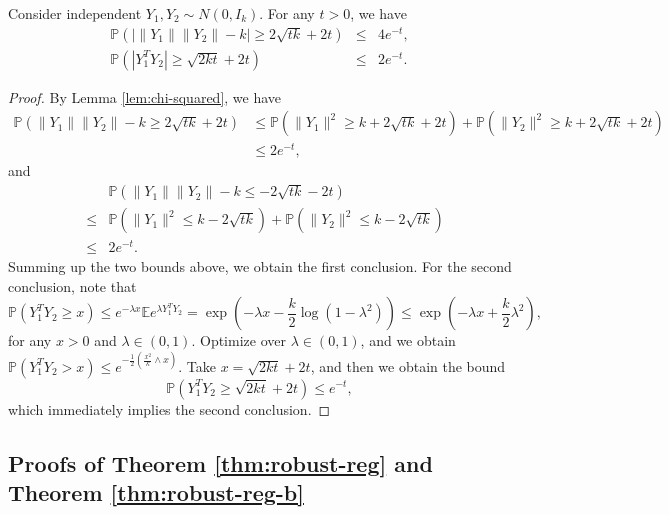 \begin{lemma}\label{lem:inner-prod}
Consider independent $Y_1,Y_2\sim N(0,I_k)$. For any $t>0$, we have
\begin{eqnarray*}
\mathbb{P}\left(|\|Y_1\|\|Y_2\|-k|\geq 2\sqrt{tk}+2t\right) &\leq& 4e^{-t}, \\
\mathbb{P}\left(|Y_1^TY_2| \geq \sqrt{2kt}+2t\right) &\leq& 2e^{-t}.
\end{eqnarray*}
\end{lemma}
\begin{proof}
By Lemma \ref{lem:chi-squared}, we have
\begin{align*}
\mathbb{P}\left(\|Y_1\|\|Y_2\| -k \geq 2\sqrt{tk}+2t\right)
&\leq \mathbb{P}\left(\|Y_1\|^2 \geq k +2\sqrt{tk}+2t\right) + \mathbb{P}\left(\|Y_2\|^2 \geq k +2\sqrt{tk}+2t\right) \\
&\leq 2e^{-t},
\end{align*}
and
\begin{eqnarray*}
&& \mathbb{P}\left(\|Y_1\|\|Y_2\| -k \leq -2\sqrt{tk}-2t\right) \\
&\leq& \mathbb{P}\left(\|Y_1\|^2 \leq k -2\sqrt{tk}\right) + \mathbb{P}\left(\|Y_2\|^2 \leq k -2\sqrt{tk}\right) \\
&\leq& 2e^{-t}.
\end{eqnarray*}
Summing up the two bounds above, we obtain the first conclusion. For the second conclusion, note that
$$\mathbb{P}\left(Y_1^TY_2 \geq x\right)\leq e^{-\lambda x}\mathbb{E}e^{\lambda Y_1^TY_2}=\exp\left(-\lambda x-\frac{k}{2}\log(1-\lambda^2)\right)\leq \exp\left(-\lambda x+\frac{k}{2}\lambda^2\right),$$
for any $x>0$ and $\lambda\in (0,1)$. Optimize over $\lambda\in (0,1)$, and we obtain $\mathbb{P}\left(Y_1^TY_2>x\right)\leq e^{-\frac{1}{2}\left(\frac{x^2}{k}\wedge x\right)}$. Take $x=\sqrt{2kt}+2t$, and then we obtain the bound
$$\mathbb{P}\left(Y_1^TY_2 \geq \sqrt{2kt}+2t\right)\leq e^{-t},$$
which immediately implies the second conclusion.
\end{proof}



\subsection{Proofs of Theorem \ref{thm:robust-reg} and Theorem \ref{thm:robust-reg-b}} \label{sec:pf-robust-reg}

